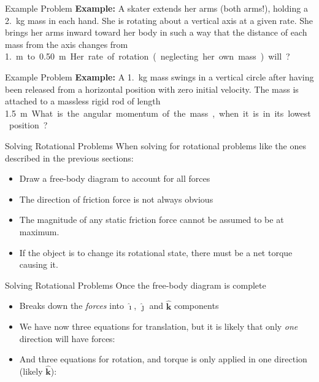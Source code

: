 \documentclass[12pt,compress,aspectratio=169]{beamer}
\newcommand{\iii}{\hat{\bm\imath}}
\newcommand{\jjj}{\hat{\bm\jmath}}
\newcommand{\kkk}{\hat{\bm{k}}}
\begin{document}
\begin{frame}{Example Problem}
  \textbf{Example:} A skater extends her arms (both arms!), holding a
  \SI{2.}{\kilo\gram} mass in each hand. She is rotating about a vertical axis
  at a given rate. She brings her arms inward toward her body in such a way that
  the distance of each mass from the axis changes from \SI{1.}\metre to
  \SI{.50}\metre. Her rate of rotation (neglecting her own mass) will?
\end{frame}




\begin{frame}{Example Problem}
  \textbf{Example:} A \SI{1.}{\kilo\gram} mass swings in a vertical circle
  after having been released from a horizontal position with zero initial
  velocity. The mass is attached to a massless rigid rod of length
  \SI{1.5}\metre. What is the angular momentum of the mass, when it is in its
  lowest position?
\end{frame}



\begin{frame}{Solving Rotational Problems}
  When solving for rotational problems like the ones described in the previous
  sections:
  \begin{itemize}
  \item Draw a free-body diagram to account for all forces
  \item The direction of friction force is not always obvious
  \item The magnitude of any static friction force cannot be assumed to be at
    maximum.
  \item If the object is to change its rotational state, there must be a net
    torque causing it.
  \end{itemize}
\end{frame}



\begin{frame}{Solving Rotational Problems}
  Once the free-body diagram is complete
  \begin{itemize}
  \item Breaks down the \emph{forces} into $\iii$, $\jjj$ and $\kkk$ components
  \item We have now three equations for translation, but it is likely that only
    \emph{one} direction will have forces:

  \item And three equations for rotation, and torque is only applied in one
    direction (likely $\kkk$):
    
  \end{itemize}
\end{frame}
\end{document}

